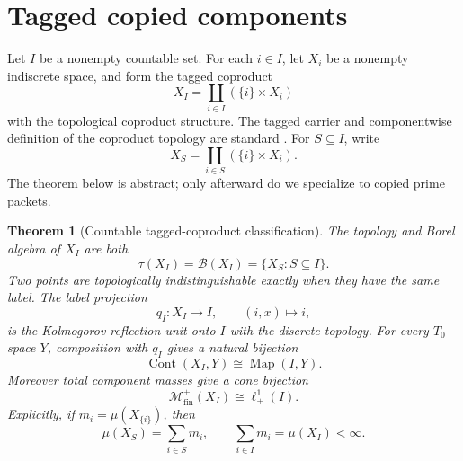 \documentclass[11pt]{article}
\newtheorem{theorem}{Theorem}[section]
\theoremstyle{definition}
\newcommand{\Borel}{\mathcal B}
\newcommand{\Mfin}{\mathcal M_{\mathrm{fin}}^+}
\begin{document}
\section{Tagged copied components}
\label{sec:coproduct}

Let $I$ be a nonempty countable set.  For each $i\in I$, let $X_i$ be a nonempty indiscrete space, and form the tagged coproduct
\[
 X_I=\coprod_{i\in I}(\{i\}\times X_i)
\]
with the topological coproduct structure.  The tagged carrier and componentwise definition of the coproduct topology are standard \cite[Section~5.29 opening, Tag~0B1W]{StacksCoproduct0B1W}.  For $S\subseteq I$, write
\[
 X_S=\coprod_{i\in S}(\{i\}\times X_i).
\]
The theorem below is abstract; only afterward do we specialize to copied prime packets.

\begin{theorem}[Countable tagged-coproduct classification]
\label{thm:coproduct}
The topology and Borel algebra of $X_I$ are both
\[
 \tau(X_I)=\Borel(X_I)=\{X_S:S\subseteq I\}.
\]
Two points are topologically indistinguishable exactly when they have the same label.  The label projection
\[
 q_I:X_I\to I,\qquad (i,x)\mapsto i,
\]
is the Kolmogorov-reflection unit onto $I$ with the discrete topology.  For every $T_0$ space $Y$, composition with $q_I$ gives a natural bijection
\[
 \operatorname{Cont}(X_I,Y)\cong\operatorname{Map}(I,Y).
\]
Moreover total component masses give a cone bijection
\[
 \Mfin(X_I)\cong\ell^1_+(I).
\]
Explicitly, if $m_i=\mu(X_{\{i\}})$, then
\[
 \mu(X_S)=\sum_{i\in S}m_i,\qquad
 \sum_{i\in I}m_i=\mu(X_I)<\infty.
\]
\end{theorem}
\end{document}
